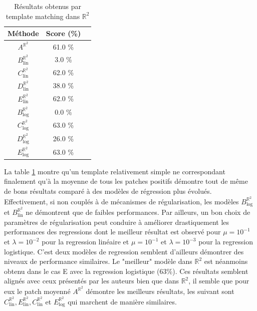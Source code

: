 \documentclass{article}
\begin{document}
\begin{table}[h!]
    \centering
    \begin{tabular}{|c|c|c|}
        \hline
        Méthode & Score (\%)\\
        \hline
        \hline
        $A^{\mathbb{R}^2}$& 61.0 \% \\
        \hline
        $B_{\text{lin}}^{\mathbb{R}^2}$& 3.0 \%    \\
        $C_{\text{lin}}^{\mathbb{R}^2}$& 62.0 \%   \\
        $D_{\text{lin}}^{\mathbb{R}^2}$& 38.0 \%   \\
        $E_{\text{lin}}^{\mathbb{R}^2}$& 62.0 \%   \\
        \hline
        $B_{\text{log}}^{\mathbb{R}^2} $& 0.0 \%   \\ 
        $C_{\text{log}}^{\mathbb{R}^2} $& 63.0 \%  \\ 
        $D_{\text{log}}^{\mathbb{R}^2} $& 26.0 \%   \\ 
        $E_{\text{log}}^{\mathbb{R}^2} $& 63.0 \%  \\ 
        \hline
    \end{tabular}
    \caption{Résultats obtenus par template matching dans $\mathbb{R}^2$}
    \label{table: R2}
\end{table}

La table \ref{table: R2} montre qu'un template relativement simple ne correspondant finalement qu'à la moyenne de tous les patches positifs démontre tout de même de bons
résultats comparé à des modèles de régression plus évolués. Effectivement, si non couplés à de mécanismes de régularisation, les modèles $B_{\text{log}}^{\mathbb{R}^2} $ et 
$B_{\text{lin}}^{\mathbb{R}^2} $ ne démontrent que de faibles performances. Par ailleurs, un bon choix de paramètres de régularisation peut conduire à améliorer drastiquement les 
performances des regressions dont le meilleur résultat est observé pour $\mu = 10^{-1}$ et $\lambda = 10^{-2}$ pour la regression linéaire et $\mu = 10^{-1}$ et $\lambda = 10^{-3}$ pour la regression logistique.
C'est deux modèles de regression semblent d'ailleurs démontrer des niveaux de performance similaires.
Le "meilleur" modèle dans $\mathbb{R}^2$ est néanmoins obtenu dans le cas E avec la regression logistique (63\%). Ces résultats semblent alignés avec ceux présentés par les auteurs bien que dans $\mathbb{R}^2$, 
il semble que pour eux le patch moyenné $A^{\mathbb{R}^2}$ démontre les meilleurs résultats, les
suivant sont $C_{\text{lin}}^{\mathbb{R}^2}, E_{\text{lin}}^{\mathbb{R}^2},
C_{\text{lin}}^{\mathbb{R}^2}$ et $E_{\text{log}}^{\mathbb{R}^2}$ qui marchent de manière 
similaires.
\end{document}
